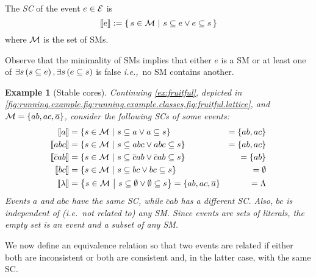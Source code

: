 \documentclass[a4paper]{article}
\newtheorem{example}{Example}
\newtheorem{example}{Example}
\newcommand{\cla}[1]{\ensuremath{{\cal #1}}}        %
\newcommand{\co}[1]{\ensuremath{\overline{#1}}}     %
\newcommand{\MODELset}{\ensuremath{\cla{M}}}
\newcommand{\EVENTSset}{\ensuremath{\cla{E}}}
\newcommand{\stablecore}[1]{\ensuremath{\left\llbracket #1 \right\rrbracket}}
\newcommand{\given}{\ensuremath{~\middle|~}}
\newcommand{\bottomclass}{\ensuremath{\Lambda}}
\newcommand{\emptyevent}{\ensuremath{\lambda}}
\begin{document}
The \textit{\acf{SC}} of the event \(e\in \EVENTSset\) is
\begin{equation}
    \stablecore{e} := \set{\, s \in \MODELset \given s \subseteq e \vee e \subseteq s\, } \label{eq:stable.core}
\end{equation}
where \(\MODELset\) is the set of \aclp{SM}.

Observe that the minimality of \aclp{SM} implies that either \(e\) is
a \acl{SM} or at least one of
$\exists s \del{s \subseteq e}, \exists s \del{e \subseteq s}$ is
false \emph{i.e.,}\ no \acl{SM} contains another.

\begin{example}[Stable cores]
\label{ex:stable.cores}\em
Continuing \cref{ex:fruitful}, depicted in
\cref{fig:running.example,fig:running.example.classes,fig:fruitful.lattice},
and \(\MODELset = \set{ab, ac, \co{a}}\), consider the following
\aclp{SC} of some events:
\begin{equation*}
  \begin{aligned}
            \stablecore{a}         & = \set{s \in \MODELset \given s \subseteq a \vee a \subseteq s}                                        & = \set{ab, ac} \\
            \stablecore{abc}       & = \set{s \in \MODELset \given s \subseteq abc \vee abc \subseteq s}                                    & = \set{ab, ac} \\
            \stablecore{\co{c}ab}  & = \set{s \in \MODELset \given s \subseteq \co{c}ab \vee \co{c}ab \subseteq s}                          & = \set{ab}     \\
            \stablecore{bc}        & = \set{s \in \MODELset \given s \subseteq bc \vee bc \subseteq s}                                      & = \emptyset    \\
            \stablecore{\emptyevent} & = \set{s \in \MODELset \given s \subseteq \emptyset \vee \emptyset \subseteq s} = \set{ab, ac, \co{a}} & = \bottomclass \\
  \end{aligned}
\end{equation*}
Events \(a\) and \(abc\) have the same \ac{SC}, while \(\co{c}ab\) has
a different \ac{SC}.  Also, \(bc\) is \emph{independent of}
(\emph{i.e.}\ not related to) any \acl{SM}.  Since events are sets of
literals, the empty set is an event and a subset of any \ac{SM}.
\end{example}

We now define an equivalence relation so that two events are related
if either both are inconsistent or both are consistent and, in the
latter case, with the same \acl{SC}.
\end{document}
